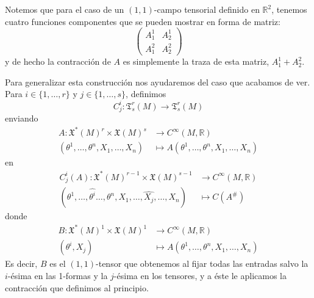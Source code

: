 \documentclass[spanish]{book}
\theoremstyle{definition}
\newcommand{\R}{\mathbb{R}}
\newcommand{\T}{\mathfrak{T}}
\newcommand{\Cinf}{C^\infty}
\begin{document}
	
	
	Notemos que para el caso de un $(1,1)$-campo tensorial definido en $\R^2$, tenemos cuatro funciones componentes que se pueden mostrar en forma de matriz:
	\[\begin{pmatrix}
		A^1_1&A^1_2\\
		A^2_1&A^2_2
	\end{pmatrix}\]
	y de hecho la contracción de $A$ es simplemente la traza de esta matriz, $A^1_1+A^2_2$.
	
	Para generalizar esta construcción nos ayudaremos del caso que acabamos de ver. Para $i\in\{1,\ldots,r\}$ y $j\in\{1,\ldots,s\}$, definimos
	\[C_j^i:\T_s^r(M)\to\T_s^r(M)\]
	enviando
	\begin{align*}
		A:\mathfrak{X}^*(M)^r\times\mathfrak{X}(M)^s&\to\Cinf(M,\R)\\
		(\theta^1,\ldots,\theta^n,X_1,\ldots,X_n)&\mapsto A(\theta^1,\ldots,\theta^n,X_1,\ldots,X_n)
	\end{align*}
	en
	\begin{align*}
		C^i_j(A):\mathfrak{X}^*(M)^{r-1}\times\mathfrak{X}(M)^{s-1}&\to\Cinf(M,\R)\\
		(\theta^1,\ldots,\hat{\theta^i}\ldots,\theta^n,X_1,\ldots,\hat{X_j},\ldots,X_n)&\mapsto C(A^\#)
	\end{align*}
	donde
	\begin{align*}
		B:\mathfrak{X}^*(M)^1\times\mathfrak{X}(M)^1&\to\Cinf(M,\R)\\
		(\theta^i,X_j)&\mapsto A(\theta^1,\ldots,\theta^n,X_1,\ldots,X_n)
	\end{align*}
	Es decir, $B$ es el $(1,1)$-tensor que obtenemos al fijar todas las entradas salvo la $i$-ésima en las 1-formas y la $j$-ésima en los tensores, y a éste le aplicamos la contracción que definimos al principio.
	
\end{document}
